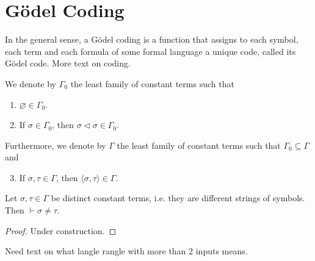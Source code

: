 \chapter{Gödel Coding}

In the general sense, a Gödel coding is a function that assigns to each symbol, each term and
each formula of some formal language a unique code, called its Gödel code.
More text on coding.

\begin{definition}
    \label{def:IsInΓ0+IsInΓ+Code}
    \leanok
    We denote by $\Gamma_0$ the least family of constant terms such that
    \begin{enumerate}
        \item $\varnothing \in \Gamma_0$.
        \item If $\sigma \in \Gamma_0$, then $\sigma \lhd \sigma \in \Gamma_0$.
    \end{enumerate}
    Furthermore, we denote by $\Gamma$ the least family of constant terms such that 
    $\Gamma_0 \subseteq \Gamma$ and 
    \begin{enumerate}\setcounter{enumi}{2} %
        \item If $\sigma, \tau \in \Gamma$, then $\langle\sigma, \tau\rangle \in \Gamma$.
    \end{enumerate}
\end{definition}

\begin{theorem}
    \label{thm:ne_of_isInΓ_and_distinct}
    \leanok
    Let $\sigma, \tau \in \Gamma$ be distinct constant terms, i.e. they are different strings of
    symbols. Then $\vdash \sigma \neq \tau$.
\end{theorem}

\begin{proof}
    Under construction.
\end{proof}

Need text on what langle rangle with more than 2 inputs means.

